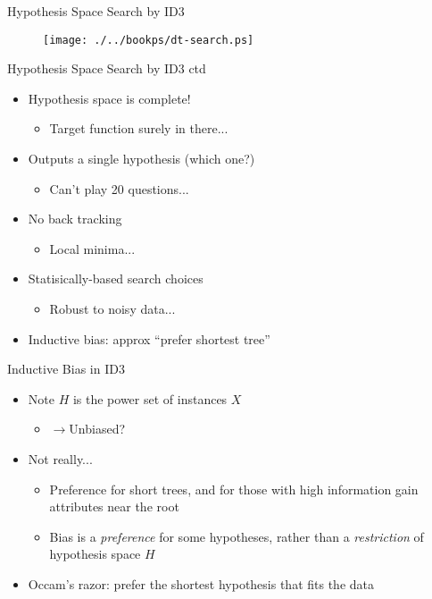 \documentclass[%
pdf,
colorBG,
slideColor,
tcrico,
]{prosper}
\begin{document}
\begin{slide}{Hypothesis Space Search by ID3 } 
\begin{figure}
	\centering
	\texttt{[image: ./../bookps/dt-search.ps]}
\end{figure}
\end{slide}

\begin{slide}{Hypothesis Space Search by ID3 ctd} 
\begin{itemize}
\item Hypothesis space is complete!
	\begin{itemize} 
	\item Target function surely in there... 
	\end{itemize}
\item Outputs a single hypothesis (which one?)
	\begin{itemize} 
	\item Can't play 20 questions... 
	\end{itemize}
\item No back tracking
	\begin{itemize} 
	\item Local minima... 
	\end{itemize}
\item Statisically-based search choices
	\begin{itemize} 
	\item Robust to noisy data... 
	\end{itemize}
\item Inductive bias: approx ``prefer shortest tree''
\end{itemize}
\end{slide}


\begin{slide}{Inductive Bias in ID3 } 
\begin{itemize}
 \item Note $H$ is the power set of instances $X$
	\begin{itemize}
	 \item 	$\to $Unbiased?
	\end{itemize}
\item  Not really...
	\begin{itemize}
	\item Preference for short trees, and for those with high information gain attributes near the root
	\item Bias is a {\em preference} for some hypotheses, rather than a {\em restriction} of hypothesis space $H$
	\end{itemize}
\item Occam's razor: prefer the shortest hypothesis that fits the data
\end{itemize}
\end{slide}
\end{document}

